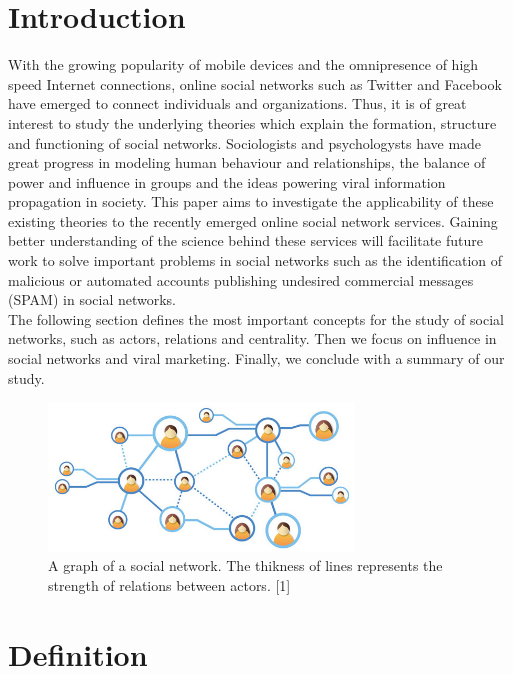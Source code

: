 \documentclass[conference,letterpaper]{IEEEtran}
\begin{document}
\section{Introduction}
With the growing popularity of mobile devices and the omnipresence of high speed Internet connections, online social networks such as Twitter and Facebook have emerged to connect individuals and organizations.
Thus, it is of great interest to study the underlying theories which explain the formation, structure and functioning of social networks. Sociologists and psychologysts have made great progress in modeling human behaviour and relationships, 
the balance of power and influence in groups and the ideas powering viral information propagation in society. This paper aims to investigate the applicability of these existing theories to the recently emerged online social network services.
Gaining better understanding of the science behind these services will facilitate future work to solve important problems in social networks such as the identification of malicious or automated accounts publishing undesired commercial messages (SPAM) in social networks.\\
\indent
The following section defines the most important concepts for the study of social networks, such as actors, relations and centrality.
Then we focus on influence in social networks and viral marketing. Finally, we conclude with a summary of our study.\\
\begin{center}
\begin{figure}[hb]
\centering
\includegraphics[width=3.2in]{social-network-grid}
\caption{
A graph of a social network. The thikness of lines represents the strength of relations between actors. [1]
}
\label{fig_sim}
\end{figure}
\end{center}
\section{Definition}
\end{document}
